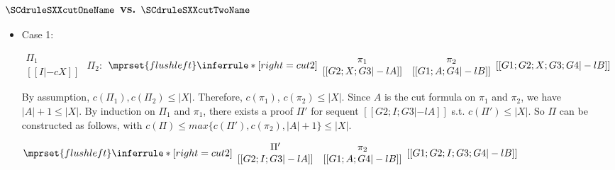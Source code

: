 \subsubsection{$\SCdruleSXXcutOneName$ vs. $\SCdruleSXXcutTwoName$}
\begin{itemize}
\item Case 1:
      \begin{center}
        \scriptsize
        \begin{math}
          \begin{array}{c}
            \Pi_1 \\
            {[[I |-c X]]}
          \end{array}
        \end{math}
        \qquad\qquad
        $\Pi_2:$
        \begin{math}
          $$\mprset{flushleft}
          \inferrule* [right={\tiny cut2}] {
            {
              \begin{array}{cc}
                \pi_1 & \pi_2 \\
                {[[G2; X; G3 |-l A]]} & {[[G1; A; G4 |-l B]]}
              \end{array}
            }
          }{[[G1; G2; X; G3; G4 |-l B]]}
        \end{math}
      \end{center}
      By assumption, $c(\Pi_1),c(\Pi_2)\leq |X|$. Therefore, $c(\pi_1)$,
      $c(\pi_2)\leq |X|$. Since $A$ is the cut formula on $\pi_1$ and
      $\pi_2$, we have $|A|+1\leq|X|$. By induction on $\Pi_1$ and $\pi_1$,
      there exists a proof $\Pi'$ for sequent $[[G2; I; G3 |-l A]]$ s.t.
      $c(\Pi')\leq|X|$. So $\Pi$ can be constructed as follows, with
      $c(\Pi)\leq max\{c(\Pi'),c(\pi_2),|A|+1\}\leq |X|$.
      \begin{center}
        \scriptsize
        \begin{math}
          $$\mprset{flushleft}
          \inferrule* [right={\tiny cut2}] {
            {
              \begin{array}{cc}
                \Pi' & \pi_2 \\
                {[[G2; I; G3 |-l A]]} & {[[G1; A; G4 |-l B]]}
              \end{array}
            }
          }{[[G1; G2; I; G3; G4 |-l B]]}
        \end{math}
      \end{center}


\end{itemize}
